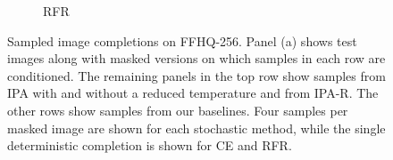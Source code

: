 \begin{figure}[t]
\begin{subfigure}[t]{0.25\textwidth}
      \caption{\scriptsize RFR}
    \end{subfigure}
    \begin{subfigure}[t]{0.16\textwidth}
      \setlength{\fboxrule}{0pt}
      \fbox{
        \begin{minipage}{1in}
          \hfill\hspace{1in}
        \end{minipage}
      }
    \end{subfigure}
    \vspace{-.5cm}
    \caption{Sampled image completions on FFHQ-256. Panel (a) shows test images along with
      masked versions on which samples in each row are conditioned. The
      remaining panels in the top row show samples from IPA with and without a
      reduced temperature and from IPA-R. The other rows show samples from our
      baselines. Four samples per masked image are shown for each stochastic
      method, while the single deterministic completion is shown for CE and
      RFR.}
    \vspace{-.5cm}
    \label{fig:cigcvae-ffhq-samples}
  \end{figure}


